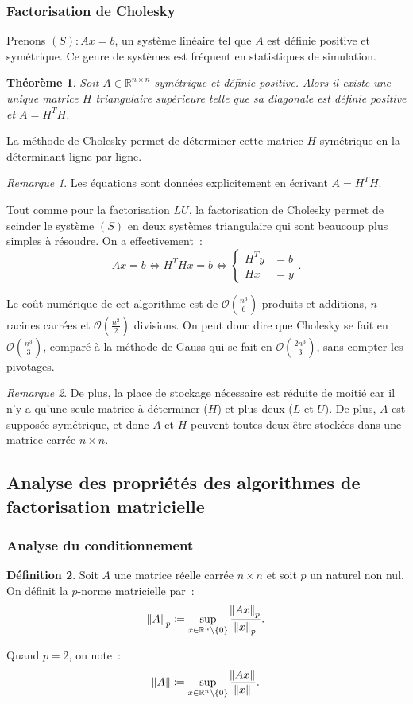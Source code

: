 \documentclass{article}
\newtheorem{thm}{Théorème}[section]
\theoremstyle{definition}
\newtheorem{déf}[thm]{Définition}
\theoremstyle{remark}
\newtheorem*{rmq}{Remarque}
\newcommand{\R}{\mathbb R}
\begin{document}
		\subsubsection{Factorisation de Cholesky}
		Prenons $(S) : Ax = b$, un système linéaire tel que $A$ est définie positive et symétrique. Ce genre de systèmes est fréquent en statistiques de
		simulation.

		\begin{thm} Soit $A \in \R^{n \times n}$ symétrique et définie positive. Alors il existe une unique matrice $H$ triangulaire supérieure telle que sa
		diagonale est définie positive et $A = H^TH$.
		\end{thm}

		La méthode de Cholesky permet de déterminer cette matrice $H$ symétrique en la déterminant ligne par ligne.

		\begin{rmq} Les équations sont données explicitement en écrivant $A = H^TH$. \end{rmq}

		Tout comme pour la factorisation $LU$, la factorisation de Cholesky permet de scinder le système $(S)$ en deux systèmes triangulaire qui sont beaucoup
		plus simples à résoudre. On a effectivement~:
		\[Ax = b \iff H^THx = b \iff \begin{cases}H^Ty &= b \\Hx &= y\end{cases}.\]

		Le coût numérique de cet algorithme est de $\mathcal O(\frac {n^3}6)$ produits et additions, $n$ racines carrées et $\mathcal O(\frac {n^2}2)$ divisions.
		On peut donc dire que Cholesky se fait en $\mathcal O(\frac {n^3}3)$, comparé à la méthode de Gauss qui se fait en $\mathcal O(\frac {2n^3}3)$, sans
		compter les pivotages.

		\begin{rmq} De plus, la place de stockage nécessaire est réduite de moitié car il n'y a qu'une seule matrice à déterminer ($H$) et plus deux ($L$ et $U$).
		De plus, $A$ est supposée symétrique, et donc $A$ et $H$ peuvent toutes deux être stockées dans une matrice carrée $n \times n$.
		\end{rmq}

	\subsection{Analyse des propriétés des algorithmes de factorisation matricielle}
		\subsubsection{Analyse du conditionnement}
		\begin{déf} Soit $A$ une matrice réelle carrée $n \times n$ et soit $p$ un naturel non nul. On définit la $p$-norme matricielle par~:
		\[\norm A_p \coloneqq \sup_{x \in \R^n \setminus \{0\}}\frac {\norm {Ax}_p}{\norm x_p}.\]

		Quand $p = 2$, on note~:
		\[\norm A \coloneqq \sup_{x \in \R^n \setminus \{0\}}\frac {\norm {Ax}}{\norm x}.\]
		\end{déf}
\end{document}
